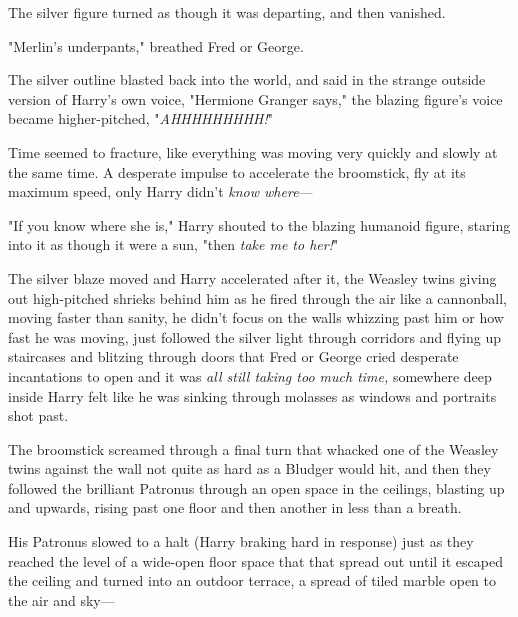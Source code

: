 The silver figure turned as though it was departing, and then vanished.

"Merlin's underpants," breathed Fred or George.

The silver outline blasted back into the world, and said in the strange outside
version of Harry's own voice, "Hermione Granger says," the blazing figure's
voice became higher-pitched, "\emph{AHHHHHHHHH!}"

Time seemed to fracture, like everything was moving very quickly and slowly at
the same time. A desperate impulse to accelerate the broomstick, fly at its
maximum speed, only Harry didn't \emph{know where}—

"If you know where she is," Harry shouted to the blazing humanoid figure,
staring into it as though it were a sun, "then \emph{take me to her!}"

The silver blaze moved and Harry accelerated after it, the Weasley twins giving
out high-pitched shrieks behind him as he fired through the air like a
cannonball, moving faster than sanity, he didn't focus on the walls whizzing
past him or how fast he was moving, just followed the silver light through
corridors and flying up staircases and blitzing through doors that Fred or
George cried desperate incantations to open and it was \emph{all still taking
too much time,} somewhere deep inside Harry felt like he was sinking through
molasses as windows and portraits shot past.

The broomstick screamed through a final turn that whacked one of the Weasley
twins against the wall not quite as hard as a Bludger would hit, and then they
followed the brilliant Patronus through an open space in the ceilings, blasting
up and upwards, rising past one floor and then another in less than a breath.

His Patronus slowed to a halt (Harry braking hard in response) just as they
reached the level of a wide-open floor space that that spread out until it
escaped the ceiling and turned into an outdoor terrace, a spread of tiled
marble open to the air and sky—
